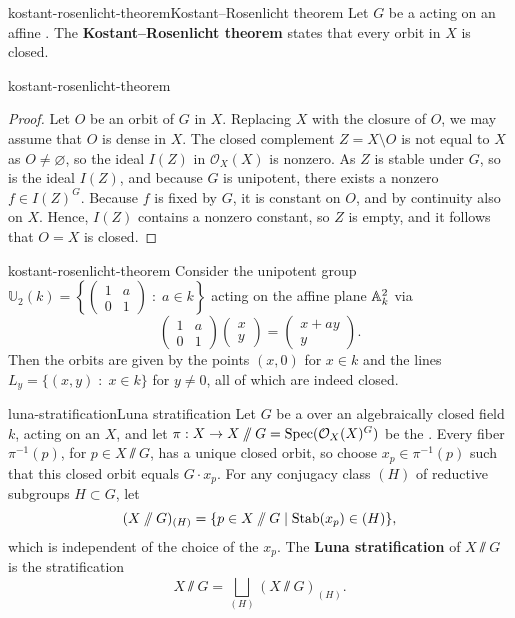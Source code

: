 \begin{topic}{kostant-rosenlicht-theorem}{Kostant--Rosenlicht theorem}
    Let $G$ be a  acting on an affine . The \textbf{Kostant--Rosenlicht theorem} states that every orbit in $X$ is closed.
\end{topic}

\begin{example}{kostant-rosenlicht-theorem}
    \begin{proof}
        Let $O$ be an orbit of $G$ in $X$. Replacing $X$ with the closure of $O$, we may assume that $O$ is dense in $X$. The closed complement $Z = X \setminus O$ is not equal to $X$ as $O \ne \varnothing$, so the ideal $I(Z)$ in $\mathcal{O}_X(X)$ is nonzero. As $Z$ is stable under $G$, so is the ideal $I(Z)$, and because $G$ is unipotent, there exists a nonzero $f \in I(Z)^G$. Because $f$ is fixed by $G$, it is constant on $O$, and by continuity also on $X$. Hence, $I(Z)$ contains a nonzero constant, so $Z$ is empty, and it follows that $O = X$ is closed.
    \end{proof}
\end{example}

\begin{example}{kostant-rosenlicht-theorem}
    Consider the unipotent group $\mathbb{U}_2(k) = \left\{ \begin{pmatrix} 1 & a \\ 0 & 1 \end{pmatrix} \;:\; a \in k \right\}$ acting on the affine plane $\AA^2_k$ via
    \[ \begin{pmatrix} 1 & a \\ 0 & 1 \end{pmatrix} \begin{pmatrix} x \\ y \end{pmatrix} = \begin{pmatrix} x + ay \\ y \end{pmatrix} . \]
    Then the orbits are given by the points $(x, 0)$ for $x \in k$ and the lines $L_y = \{ (x, y) \;:\; x \in k \}$ for $y \ne 0$, all of which are indeed closed.
\end{example}

\begin{topic}{luna-stratification}{Luna stratification}
    Let $G$ be a  over an algebraically closed field $k$, acting on an   $X$, and let $\pi : X \to X \sslash G = \Spec(\mathcal{O}_X(X)^G)$ be the .
    Every fiber $\pi^{-1}(p)$, for $p \in X \sslash G$, has a unique closed orbit, so choose $x_p \in \pi^{-1}(p)$ such that this closed orbit equals $G \cdot x_p$. For any conjugacy class $(H)$ of reductive subgroups $H \subset G$, let 
    \[ (X \sslash G)_{(H)} = \{ p \in X \sslash G \mid \textup{Stab}(x_p) \in (H) \} , \]
    which is independent of the choice of the $x_p$. The \textbf{Luna stratification} of $X \sslash G$ is the stratification
    \[ X \sslash G = \bigsqcup_{(H)} (X \sslash G)_{(H)} . \]
\end{topic}

